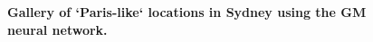\documentclass[10pt,letterpaper]{article}
\begin{document}
\begin{figure}[!htbp]
\caption{\bf Gallery of `Paris-like` locations in Sydney using the GM neural network.}    
 \label{fig:gm_syd_gallery}  
\end{figure} 
\end{document}
